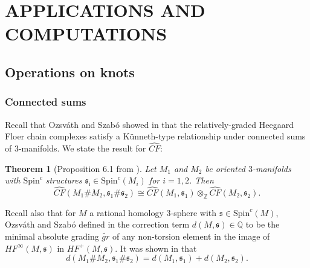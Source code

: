 \documentclass[11pt]{article}
\theoremstyle{plain} \newtheorem{thm}{Theorem}[subsection]
\theoremstyle{plain} \newtheorem{cor}[thm]{Corollary}
\theoremstyle{plain} \newtheorem{prop}[thm]{Proposition}
\theoremstyle{plain} \newtheorem{conj}[thm]{Conjecture}
\theoremstyle{plain} \newtheorem{lem}[thm]{Lemma}
\theoremstyle{definition} \newtheorem{df}[thm]{Definition}
\theoremstyle{remark} \newtheorem{rmk}[thm]{Remark}
\theoremstyle{remark} \newtheorem{obs}[thm]{Observation}
\newcommand{\tld}[1]{\widetilde{#1}}
\newcommand{\OS}{Ozsv\'ath and Szab\'o }
\numberwithin{equation}{section}
\begin{document}
\section{APPLICATIONS AND COMPUTATIONS}

\subsection{Operations on knots}

\subsubsection{Connected sums}\label{sec:sum}

Recall that \OS showed in \cite{os:disk2} that the relatively-graded Heegaard Floer chain complexes satisfy a K\"unneth-type relationship under connected sums of $3$-manifolds.  We state the result for $\widehat{CF}$:
\begin{thm}[Proposition 6.1 from \cite{os:disk2}]\label{thm:ossum}
Let $M_{1}$ and $M_{2}$ be oriented $3$-manifolds with $\text{Spin}^{c}$ structures $\mathfrak{s_{i}} \in \text{Spin}^{c}(M_{i})$ for $i= 1,2$.  Then 
\begin{equation*}
\widehat{CF}(M_{1} \# M_{2} , \mathfrak{s}_{1} \# \mathfrak{s}_{2}) \cong
	\widehat{CF}(M_{1}, \mathfrak{s_{1}})
		\otimes_{\mathbb{Z}}
	\widehat{CF}(M_{2}, \mathfrak{s_{2}}).
\end{equation*}
\end{thm}

Recall also that for $M$ a rational homology $3$-sphere with $\mathfrak{s} \in \text{Spin}^{c}(M)$, Ozsv\'ath  and Szab\'o defined in \cite{os:abs} the correction term $d(M,\mathfrak{s}) \in \mathbb{Q}$ to be the minimal absolute grading $\tld{gr}$ of any non-torsion element in the image of $HF^{\infty}(M,\mathfrak{s})$ in $HF^{+}(M,\mathfrak{s})$.  It was shown in \cite{os:abs} that
\begin{equation*}
d(M_{1} \# M_{2}, \mathfrak{s}_{1} \# \mathfrak{s}_{2}) = d(M_{1},\mathfrak{s}_{1}) + d(M_{2},\mathfrak{s}_{2}).
\end{equation*}
\end{document}
